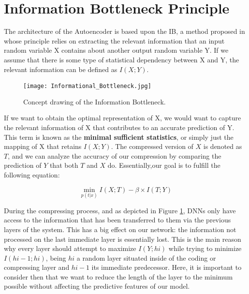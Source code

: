 \section{Information Bottleneck Principle}

The architecture of the Autoencoder is based upon the IB, a method proposed in \cite{Inf_Bottleneck_first} whose principle relies on extracting the relevant information that an input random variable X contains about another output random variable Y. If we assume that there is some type of statistical dependency between X and Y, the relevant information can be defined as $I(X;Y)$.\par

\begin{figure}[H]
	\centering
	\texttt{[image: Informational\_Bottleneck.jpg]}
	\caption{Concept drawing of the Information Bottleneck.}
	\label{fig:figure_info_bottle}
\end{figure} 

If we want to obtain the optimal representation of X, we would want to capture the relevant information of X that contributes to an accurate prediction of Y. This term is known as the \textbf{minimal sufficient statistics}, or simply just the mapping of X that retains $I(X;Y)$. The compressed version of $X$ is denoted as $T$, and we can analyze the accuracy of our compression by comparing the prediction of $Y$ that both $T$ and $X$ do. Essentially,our goal is to fulfill the following equation: \newline 

\begin{equation}\label{eq:Bottleneck_equation}
\min\limits_{p(t|x)}  I(X;T) - \beta \times I(T;Y)
\end{equation} \newline

During the compressing process, and as depicted in Figure \ref{fig:figure_info_bottle}, DNNs only have access to the information that has been transferred to them via the previous layers of the system. This has a big effect on our network: the information not processed on the last immediate layer is essentially lost. This is the main reason why every layer should attempt to maximize $I(Y;hi)$ while trying to minimize $I(hi-1;hi)$, being $hi$ a random layer situated inside of the coding or compressing layer and $hi-1$ its immediate predecessor. Here, it is important to consider then that we want to reduce the length of the layer to the minimum possible without affecting the predictive features of our model. \par

